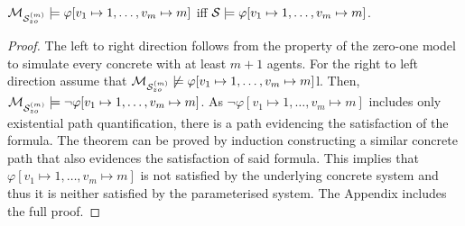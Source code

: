 \begin{theorem}
$\mathcal{M}_{\mathcal{S}_{zo}^{(m)}} \models \varphi[v_1 \mapsto 1, \ldots, v_m \mapsto m]$ iff $\mathcal S
\models  \varphi[v_1 \mapsto 1, \ldots, v_m \mapsto m]$.
\end{theorem}
\begin{proof}
The left to right direction follows from the property of the zero-one model to
simulate every concrete with at least $m+1$ agents.  For the right to left
direction  assume that $\mathcal{M}_{\mathcal{S}_{zo}^{(m)}} \not \models \varphi[v_1 \mapsto 1, \ldots, v_m
\mapsto m]$l. Then, $\mathcal{M}_{\mathcal{S}_{zo}^{(m)}}  \models \neg \varphi[v_1 \mapsto 1, \ldots, v_m
\mapsto m]$. As $\neg \varphi[v_1 \mapsto 1, \ldots, v_m \mapsto m]$ includes
only existential path quantification, there is a path evidencing the
satisfaction of the formula. The theorem can be proved by induction
constructing a similar concrete path that also evidences the satisfaction of
said formula. This implies that $\varphi[v_1 \mapsto 1, \ldots, v_m \mapsto m]$
is not satisfied by the underlying concrete system and thus it is neither
satisfied by the parameterised system. The Appendix includes the full proof.
\end{proof}


